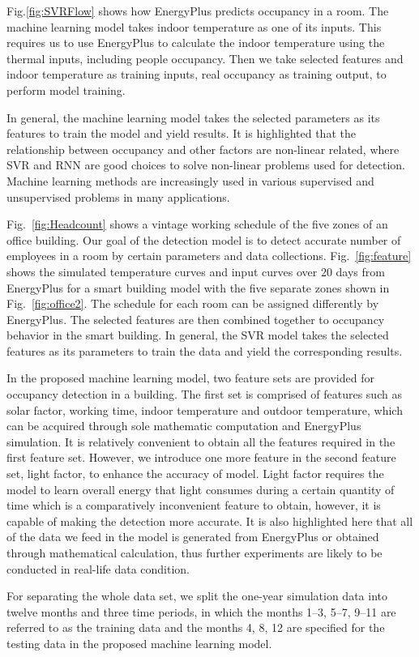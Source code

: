 Fig.\ref{fig:SVRFlow} shows how EnergyPlus predicts occupancy in a room. The
machine learning model takes indoor temperature as one of its inputs. This
requires us to use EnergyPlus to calculate the indoor temperature using the
thermal inputs, including people occupancy. Then we take selected features and
indoor temperature as training inputs, real occupancy as training output, to
perform model training.

In general, the machine learning model takes the selected parameters
as its features to train the model and yield results. It is highlighted
that the relationship between occupancy and other factors are
non-linear related, where SVR and RNN are good choices to
solve non-linear problems used for detection. Machine learning methods are
increasingly used in various supervised and unsupervised problems
in many applications.

Fig.~\ref{fig:Headcount} shows a vintage working schedule of the five
zones of an office building. Our goal of the detection model is to
detect accurate number of employees in a room by certain parameters
and data collections. Fig.~\ref{fig:feature} shows the simulated
temperature curves and input curves over 20 days from EnergyPlus for a
smart building model with the five separate zones shown in
Fig.~\ref{fig:office2}. The schedule for each room can be assigned
differently by EnergyPlus. The selected features are then combined
together to occupancy behavior in the smart building. In general, the
SVR model takes the selected features as its parameters to train the
data and yield the corresponding results.

In the proposed machine learning model, two feature sets
are provided for occupancy detection in a building. The first set is comprised
of features such as solar factor, working time, indoor temperature and outdoor
temperature, which can be acquired through sole mathematic computation and
EnergyPlus simulation. It is relatively convenient to obtain all the features
required in the first feature set. However, we introduce one more feature in
the second feature set, light factor, to enhance the accuracy of model. Light
factor requires the model to learn overall energy that light consumes during a
certain quantity of time which is a comparatively inconvenient feature to
obtain, however, it is capable of making the detection more accurate. It is
also highlighted here that all of the data we feed in the model is generated
from EnergyPlus or obtained through mathematical calculation, thus further
experiments are likely to be conducted in real-life data condition.

For separating the whole data set, we split the one-year simulation
data into twelve months and three time periods, in which the months
1--3, 5--7, 9--11 are referred to as the training data and the months 4,
8, 12 are specified for the testing data in the proposed machine
learning model.
